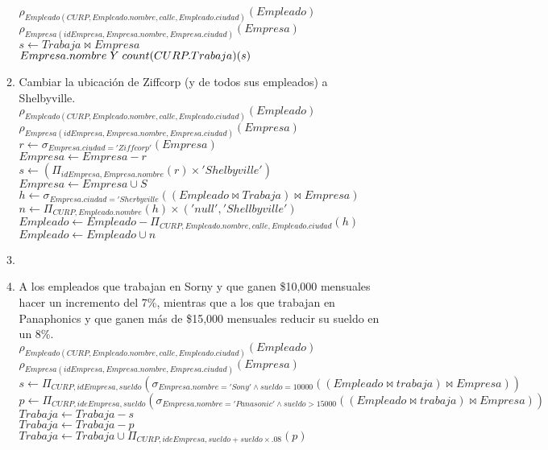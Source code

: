 \documentclass{article}
\begin{document}
\begin{enumerate}
\begin{enumerate}
				$\rho_{Empleado(CURP, Empleado.nombre, calle, Empleado.ciudad)}(Empleado)$\\
				$\rho_{Empresa(idEmpresa, Empresa.nombre, Empresa.ciudad)}(Empresa)$\\
				$s \leftarrow Trabaja \bowtie Empresa$\\
				${Empresa.nombre} \hspace{1mm} Y \hspace{1mm} {count(CURP.Trabaja)(s)}$\\
				
				\item Cambiar la ubicación de Ziffcorp (y de todos sus empleados) a Shelbyville.\\
				
				$\rho_{Empleado(CURP, Empleado.nombre, calle, Empleado.ciudad)}(Empleado)$\\
				$\rho_{Empresa(idEmpresa, Empresa.nombre, Empresa.ciudad)}(Empresa)$\\
				$r \leftarrow \sigma_{Empresa.ciudad = 'Ziffcorp'}(Empresa)$\\
				$Empresa \leftarrow Empresa - r$\\
				$s \leftarrow (\Pi_{idEmpresa, Empresa.nombre}(r) \times 'Shelbyville')$\\
				$Empresa \leftarrow Empresa \cup S$\\
				$h \leftarrow \sigma_{Empresa.ciudad = 'Sherbyville}((Empleado \bowtie Trabaja) \bowtie Empresa)$\\
				$n \leftarrow \Pi_{CURP, Empleado.nombre}(h) \times ('null', 'Shellbyville')$\\
				$Empleado \leftarrow Empleado - \Pi_{CURP, Empleado.nombre, calle, Empleado.ciudad}(h)$\\
				$Empleado \leftarrow Empleado \cup n$
				
				\item
				\item A los empleados que trabajan en Sorny y que ganen \$10,000 mensuales hacer un incremento
				del 7\%, mientras que a los que trabajan en Panaphonics y que ganen más de \$15,000
				mensuales reducir su sueldo en un 8\%.\\
				
				$\rho_{Empleado(CURP, Empleado.nombre, calle, Empleado.ciudad)}(Empleado)$\\
				$\rho_{Empresa(idEmpresa, Empresa.nombre, Empresa.ciudad)}(Empresa)$\\
				$s \leftarrow \Pi_{CURP,idEmpresa, sueldo}(\sigma_{Empresa.nombre = 'Sony' \land sueldo = 10000}((Empleado \bowtie trabaja) \bowtie Empresa))$\\
				$p \leftarrow \Pi_{CURP, ideEmpresa, sueldo}(\sigma_{Empresa.nombre = 'Panasonic' \land sueldo > 15000}((Empleado \bowtie trabaja) \bowtie Empresa))$\\
				$Trabaja \leftarrow Trabaja - s$\\
				$Trabaja \leftarrow Trabaja - p$\\
				$Trabaja \leftarrow Trabaja\cup \Pi_{CURP, ideEmpresa, sueldo + sueldo \times .08}(p)$\\
				

\end{enumerate}
\end{enumerate}
\end{document}
